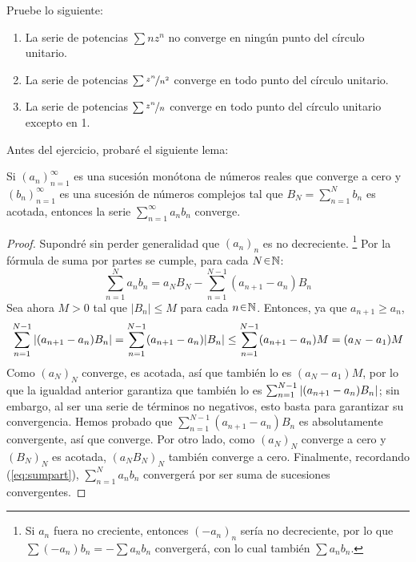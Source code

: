 \setcounter{eje}{18}
\begin{ejer}
Pruebe lo siguiente:
\begin{enumerate}[label=(\alph*), leftmargin=1.8em]
\item La serie de potencias $\sum n z^n$ no converge en ningún punto del círculo unitario.
\item La serie de potencias $\sum \nicefrac{z^n}{n^2}$ converge en todo punto del círculo unitario.
\item La serie de potencias $\sum \nicefrac{z^n}{n}$ converge en todo punto del círculo unitario excepto en 1.
\end{enumerate}
\end{ejer}
\begin{sol}
Antes del ejercicio, probaré el siguiente lema:
\begin{lema}\label{lema:dirichtest}
    Si $(a_n)^\infty_{n=1}$ es una sucesión monótona de números reales que converge a cero y $(b_n)^\infty_{n=1}$ es una sucesión de números complejos tal que $B_N = \sum^N_{n=1}b_n$ es acotada, entonces la serie $\sum^\infty_{n=1}a_nb_n$ converge.
\begin{proof}
    Supondré sin perder generalidad que $(a_n)_n$ es no decreciente.%
    \footnote{
    Si $a_n$ fuera no creciente, entonces $(-a_n)_n$ sería no decreciente, por lo que $\sum(-a_n)b_n = -\sum a_nb_n$ convergerá, con lo cual también $\sum a_nb_n$.
    }
    Por la fórmula de suma por partes se cumple, para cada $N\en\mathbb{N}$:
    \begin{equation}\label{eq:sumpart}
    \sum^N_{n=1}a_nb_n = a_NB_N - \sum^{N-1}_{n=1}(a_{n+1}-a_n)B_n
    \end{equation}
    Sea ahora $M>0$ tal que $|B_n| \leq M$ para cada $n\en\mathbb{N}$. Entonces, ya que $a_{n+1} \geq a_n$,
    \[
    \sum^{N-1}_{n=1} \abs{(a_{n+1} - a_n)B_n}%
    = \sum^{N-1}_{n=1} (a_{n+1} - a_n)\abs{B_n}%
    \leq \sum^{N-1}_{n=1} (a_{n+1} - a_n)M%
    = (a_{N} - a_1)M
    \]
    Como $(a_N)_N$ converge, es acotada, así que también lo es $(a_N-a_1)M$, por lo que la igualdad anterior garantiza que también lo es $\sum^{N-1}_{n=1} \abs{(a_{n+1} - a_n)B_n}$; sin embargo, al ser una serie de términos no negativos, esto basta para garantizar su convergencia. Hemos probado que $\sum^{N-1}_{n=1}(a_{n+1}-a_n)B_n$ es absolutamente convergente, así que converge. Por otro lado, como $(a_N)_N$ converge a cero y $(B_N)_N$ es acotada, $(a_NB_N)_N$ también converge a cero. Finalmente, recordando (\ref{eq:sumpart}), $\sum^N_{n=1}a_nb_n$ convergerá por ser suma de sucesiones convergentes.

\end{proof}
\end{lema}
\end{sol}
